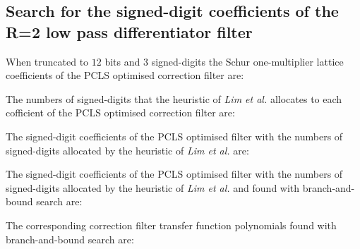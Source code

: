 \documentclass[a4paper,twoside,10pt,english]{article}
\begin{document}
\subsection{Search for the signed-digit coefficients of the R=2 low pass differentiator filter}
When truncated to $12$ bits and $3$ signed-digits the Schur one-multiplier
lattice coefficients of the PCLS optimised correction filter are:
\begin{small}


\end{small}

The numbers of signed-digits that the heuristic of \emph{Lim et al.} allocates to
each cofficient of the PCLS optimised correction filter are:
\begin{small}


\end{small}

The signed-digit coefficients of the PCLS optimised filter with the
numbers of signed-digits allocated by the heuristic of \emph{Lim et al.} are:
\begin{small}


\end{small}

The signed-digit coefficients of the PCLS optimised filter with the
numbers of signed-digits allocated by the heuristic of \emph{Lim et al.} and
found with branch-and-bound search are:
\begin{small}


\end{small}
The corresponding correction filter transfer function polynomials found with
branch-and-bound search are:
\begin{small}


\end{small}
\end{document}
